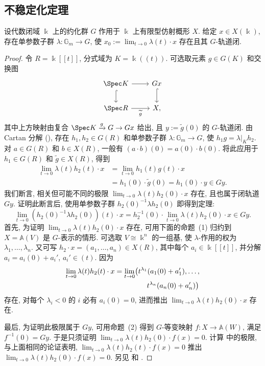 \subsection{不稳定化定理}\label{src:8.3.2-subsection}
\begin{theorem}[不稳定化定理]\label{src:8.3.6}
设代数闭域 $\Bbbk$ 上的约化群 $G$ 作用于 $\Bbbk$ 上有限型仿射概形 $X$. 给定 $x\in X(\Bbbk)$, 存在单参数子群 $\lambda:\mathbb G_m\to G$, 使 $x_0:=\lim_{t\to0}\lambda(t)\cdot x$ 存在且其 $G$-轨道闭.
\end{theorem}
\begin{proof}
令 $R=\Bbbk[\![t]\!]$, 分式域为 $K=\Bbbk((t))$. 可选取元素 $g\in G(K)$ 和交换图
\[
\begin{tikzcd}[ampersand replacement=\&]
\Spec K\arrow[r]\arrow[d,hook]\&Gx\arrow[d,hook]\\
\Spec R\arrow[r,"\widetilde g"']\&X,
\end{tikzcd}
\]
其中上方映射由复合 $\Spec K\xrightarrow{g}G\to Gx$ 给出, 且 $y:=\widetilde g(0)$ 的 $G$-轨道闭. 由 Cartan 分解 (), 存在 $h_1,h_2\in G(R)$ 和单参数子群 $\lambda:\mathbb G_m\to G$, 使 $h_1g=\lambda|_Kh_2$. 对 $a\in G(R)$ 和 $b\in X(R)$, 一般有 $(a\cdot b)(0)=a(0)\cdot b(0)$. 将此应用于 $h_1\in G(R)$ 和 $\widetilde g\in X(R)$, 得到
\begin{align*}
\lim_{t\to0}\lambda(t)h_2(t)\cdot x
&=\lim_{t\to0}h_1(t)g(t)\cdot x\\
&=h_1(0)\cdot\widetilde g(0)=h_1(0)\cdot y\in Gy.
\end{align*}
我们断言, 相关但可能不同的极限 $\lim_{t\to0}\lambda(t)h_2(0)\cdot x$ 存在, 且也属于闭轨道 $Gy$. 证明此断言后, 使用单参数子群 $h_2(0)^{-1}\lambda h_2(0)$ 即得到定理:
\[
\lim_{t\to0}(h_2(0)^{-1}\lambda h_2(0))(t)\cdot x
=h_2^{-1}(0)\cdot\lim_{t\to0}\lambda(t)h_2(0)\cdot x\in Gy.
\]
首先, 为证明 $\lim_{t\to0}\lambda(t)h_2(0)\cdot x$ 存在, 可用下面的命题~(1) 归约到 $X=\mathbb A(V)$ 是 $G$-表示的情形. 可选取 $V\cong\Bbbk^n$ 的一组基, 使 $\lambda$-作用的权为 $\lambda_1,\ldots,\lambda_n$. 又可写 $h_2\cdot x=(a_1,\ldots,a_n)\in X(R)$, 其中每个 $a_i\in\Bbbk[\![t]\!]$, 并分解 $a_i=a_i(0)+a_i'$, $a_i'\in(t)$. 因为
\begin{equation}\label{src:8.3.7}
\begin{aligned}
\lim_{t\to0}\lambda(t)h_2(t)\cdot x
&=\lim_{t\to0}\bigl(t^{\lambda_1}(a_1(0)+a_1'),\ldots,\\
&\hspace{4.5em}t^{\lambda_n}(a_n(0)+a_n')\bigr)
\end{aligned}
\end{equation}
存在, 对每个 $\lambda_i<0$ 的 $i$ 必有 $a_i(0)=0$, 进而推出 $\lim_{t\to0}\lambda(t)h_2(0)\cdot x$ 存在.

最后, 为证明此极限属于 $Gy$, 可用命题~(2) 得到 $G$-等变映射 $f:X\to\mathbb A(W)$, 满足 $f^{-1}(0)=Gy$. 于是只须证明 $\lim_{t\to0}\lambda(t)h_2(0)\cdot f(x)=0$. 计算  中的极限, 与上面相同的论证表明, $\lim_{t\to0}\lambda(t)h_2(t)\cdot f(x)=0$ 推出 $\lim_{t\to0}\lambda(t)h_2(0)\cdot f(x)=0$. 另见 \cite[第 53 页]{GIT} 和 \cite[定理 1.4]{Kem78}.
\end{proof}

